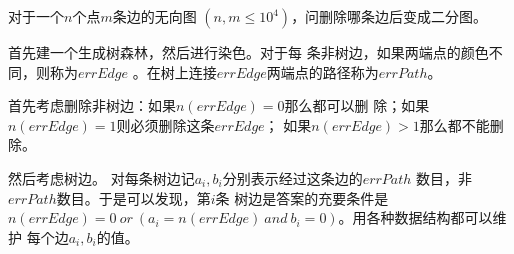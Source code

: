 \begin{prob}
	对于一个$n$个点$m$条边的无向图
	$(n,m\le 10^4)$，问删除哪条边后变成二分图。
\end{prob}

\begin{sol}
	首先建一个生成树森林，然后进行染色。对于每
	条非树边，如果两端点的颜色不同，则称为$errEdge$
	。在树上连接$errEdge$两端点的路径称为$errPath$。
	\par
	首先考虑删除非树边：如果$n(errEdge)=0$那么都可以删
	除；如果$n(errEdge)=1$则必须删除这条$errEdge$；
	如果$n(errEdge)>1$那么都不能删除。
	\par
	然后考虑树边。
	对每条树边记$a_i,b_i$分别表示经过这条边的$errPath$
	数目，非$errPath$数目。于是可以发现，第$i$条
	树边是答案的充要条件是$n(errEdge)=0\ or
	\ (a_i=n(errEdge)\ and\ b_i=0)$。用各种数据结构都可以维护
	每个边$a_i, b_i$的值。
\end{sol}
